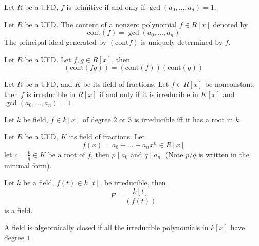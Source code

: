 \documentclass[openany]{book}
\begin{document}
\begin{prop}
    Let $R$ be a UFD, $f$ is primitive if and only if $\gcd(a_0,\dots, a_d)=1$.
\end{prop}

\begin{defn}
    Let $R$ be a UFD.
    The content of a nonzero polynomial $f\in R[x]$ denoted by 
    \begin{equation*}
        \text{cont}(f)=\gcd(a_0,\dots,a_n)
    \end{equation*}
    The principal ideal generated by $(\text{cont}f)$ is uniquely determined by $f$.
\end{defn}

\begin{prop}
    Let $R$ be a UFD. Let $f,g\in R[x]$, then 
    \begin{equation*}
        (\text{cont}(fg))=(\text{cont}(f))(\text{cont}(g))
    \end{equation*}
\end{prop}



\begin{prop}
    Let $R$ be a UFD, and $K$ be its field of fractions. Let $f\in R[x]$ be nonconstant, then $f$ is irreducible in $R[x]$ if and only if it is irreducible in $K[x]$ and $\gcd(a_0,\dots, a_n)=1$ 
\end{prop}

\begin{prop}
    Let $k$ be field, $f\in k[x]$ of degree $2$ or $3$ is irreducible iff it has a root in $k$.
\end{prop}

\begin{prop}
    Let $R$ be a UFD, $K$ its field of fractions.  Let 
    \begin{equation*}
        f(x)=a_0+\dots+a_nx^n\in R[x]
    \end{equation*}
    let $c=\frac{p}{q}\in K$ be a root of $f$, then $p\mid a_0$ and $q\mid a_n$.  (Note $p/q$ is written in the minimal form).
\end{prop}


\begin{prop}
    Let $k$ be a field, $f(t)\in k[t]$, be irreducible, then 
    \begin{equation*}
        F=\frac{k[t]}{(f(t))}
    \end{equation*}
    is a field.
\end{prop}


\begin{defn}
    A field is algebraically closed if all the irreducible polynomials in $k[x]$ have degree $1$.
\end{defn}
\end{document}
